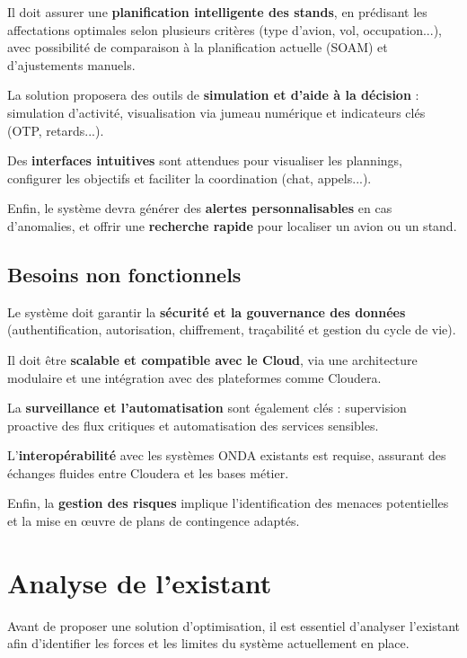 Il doit assurer une \textbf{planification intelligente des stands}, en prédisant les affectations optimales selon plusieurs critères (type d’avion, vol, occupation...), avec possibilité de comparaison à la planification actuelle (\ac{SOAM}) et d’ajustements manuels.

La solution proposera des outils de \textbf{simulation et d’aide à la décision} : simulation d’activité, visualisation via jumeau numérique et indicateurs clés (OTP, retards...).

Des \textbf{interfaces intuitives} sont attendues pour visualiser les plannings, configurer les objectifs et faciliter la coordination (chat, appels...).

Enfin, le système devra générer des \textbf{alertes personnalisables} en cas d’anomalies, et offrir une \textbf{recherche rapide} pour localiser un avion ou un stand.

\subsection{Besoins non fonctionnels}
\vspace{-0.5em}
Le système doit garantir la \textbf{sécurité et la gouvernance des données} (authentification, autorisation, chiffrement, traçabilité et gestion du cycle de vie).

Il doit être \textbf{scalable et compatible avec le Cloud}, via une architecture modulaire et une intégration avec des plateformes comme Cloudera.

La \textbf{surveillance et l’automatisation} sont également clés : supervision proactive des flux critiques et automatisation des services sensibles.

L’\textbf{interopérabilité} avec les systèmes \ac{ONDA} existants est requise, assurant des échanges fluides entre Cloudera et les bases métier.

Enfin, la \textbf{gestion des risques} implique l’identification des menaces potentielles et la mise en œuvre de plans de contingence adaptés.

\vspace{-1.2em}

\section{Analyse de l’existant}

Avant de proposer une solution d’optimisation, il est essentiel d’analyser l’existant afin d’identifier les forces et les limites du système actuellement en place.
\vspace{-1.2em}
